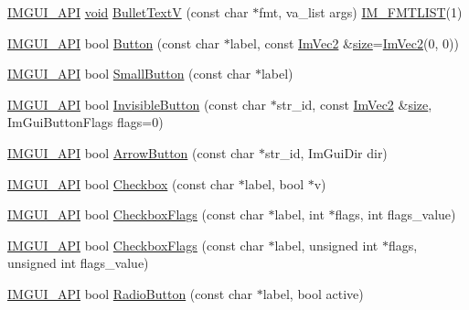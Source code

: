 \begin{DoxyCompactItemize}
\item 
\hyperlink{imgui_8h_a43829975e84e45d1149597467a14bbf5}{I\+M\+G\+U\+I\+\_\+\+A\+PI} \hyperlink{imgui__impl__opengl3__loader_8h_ac668e7cffd9e2e9cfee428b9b2f34fa7}{void} \hyperlink{namespaceImGui_af8f4b5e96c745e205974857f9a584583}{Bullet\+TextV} (const char $\ast$fmt, va\+\_\+list args) \hyperlink{imgui_8h_a047693beb7f899f5deab1e20202016b3}{I\+M\+\_\+\+F\+M\+T\+L\+I\+ST}(1)
\item 
\hyperlink{imgui_8h_a43829975e84e45d1149597467a14bbf5}{I\+M\+G\+U\+I\+\_\+\+A\+PI} bool \hyperlink{namespaceImGui_a38094c568ce398db5a3abb9d3ac92030}{Button} (const char $\ast$label, const \hyperlink{structImVec2}{Im\+Vec2} \&\hyperlink{imgui__impl__opengl3__loader_8h_a3d1e3edfcf61ca2d831883e1afbad89e}{size}=\hyperlink{structImVec2}{Im\+Vec2}(0, 0))
\item 
\hyperlink{imgui_8h_a43829975e84e45d1149597467a14bbf5}{I\+M\+G\+U\+I\+\_\+\+A\+PI} bool \hyperlink{namespaceImGui_a5b76ec69758aeb0a00a66f142f7a4fb2}{Small\+Button} (const char $\ast$label)
\item 
\hyperlink{imgui_8h_a43829975e84e45d1149597467a14bbf5}{I\+M\+G\+U\+I\+\_\+\+A\+PI} bool \hyperlink{namespaceImGui_a1f61951b9d3a38083bd77b1dbe3ea895}{Invisible\+Button} (const char $\ast$str\+\_\+id, const \hyperlink{structImVec2}{Im\+Vec2} \&\hyperlink{imgui__impl__opengl3__loader_8h_a3d1e3edfcf61ca2d831883e1afbad89e}{size}, Im\+Gui\+Button\+Flags flags=0)
\item 
\hyperlink{imgui_8h_a43829975e84e45d1149597467a14bbf5}{I\+M\+G\+U\+I\+\_\+\+A\+PI} bool \hyperlink{namespaceImGui_ad2bc397a02d5e4b8a14360d89abc6242}{Arrow\+Button} (const char $\ast$str\+\_\+id, Im\+Gui\+Dir dir)
\item 
\hyperlink{imgui_8h_a43829975e84e45d1149597467a14bbf5}{I\+M\+G\+U\+I\+\_\+\+A\+PI} bool \hyperlink{namespaceImGui_a57d73c1d0ef807fef734d91024092027}{Checkbox} (const char $\ast$label, bool $\ast$v)
\item 
\hyperlink{imgui_8h_a43829975e84e45d1149597467a14bbf5}{I\+M\+G\+U\+I\+\_\+\+A\+PI} bool \hyperlink{namespaceImGui_ab40105d09d9fa234721901da6e196a65}{Checkbox\+Flags} (const char $\ast$label, int $\ast$flags, int flags\+\_\+value)
\item 
\hyperlink{imgui_8h_a43829975e84e45d1149597467a14bbf5}{I\+M\+G\+U\+I\+\_\+\+A\+PI} bool \hyperlink{namespaceImGui_aeca400dcf5a82c312b3e669d2fe6e88d}{Checkbox\+Flags} (const char $\ast$label, unsigned int $\ast$flags, unsigned int flags\+\_\+value)
\item 
\hyperlink{imgui_8h_a43829975e84e45d1149597467a14bbf5}{I\+M\+G\+U\+I\+\_\+\+A\+PI} bool \hyperlink{namespaceImGui_a6b146763845cbad5a4144772279631bc}{Radio\+Button} (const char $\ast$label, bool active)

\end{DoxyCompactItemize}
